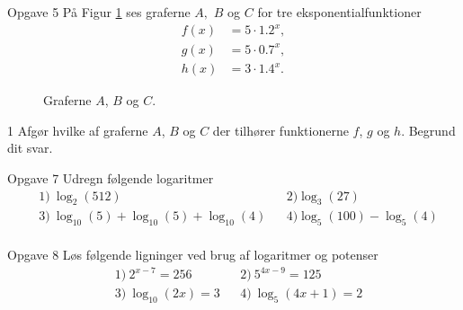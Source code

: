 \begin{opgavetekst}{Opgave 5}
	På Figur \ref{fig:grafer} ses graferne $A,$ $B$ og $C$ for tre eksponentialfunktioner
	\begin{align*}
		f(x) &= 5\cdot 1.2^x,\\
		g(x) &= 5 \cdot 0.7^x,  \\
		h(x) &= 3 \cdot 1.4^x.
	\end{align*}
	\begin{figure}[H]
		\centering
		\caption{Graferne $A$, $B$ og $C$.}
		\label{fig:grafer}
	\end{figure}
	\phantom{h}
\end{opgavetekst}
\begin{delopgave}{}{1}
	Afgør hvilke af graferne $A$, $B$ og $C$ der tilhører funktionerne $f$, $g$ og $h$. Begrund dit svar.
\end{delopgave}

\begin{opgavetekst}{Opgave 7}
	Udregn følgende logaritmer
	\begin{align*}
		&1) \  \log_2(512)  &   &2) \log_3(27) \\
		&3) \  \log_{10}(5) + \log_{10}(5) + \log_{10}(4)  &   &4) \log_5(100) - \log_5(4) \\
	\end{align*}
\end{opgavetekst}

\begin{opgavetekst}{Opgave 8}
	Løs følgende ligninger ved brug af logaritmer og potenser
	\begin{align*}
		&1) \ 2^{x-7} = 256 &   &2) \ 5^{4x-9} = 125\\
		&3) \ \log_{10}(2x) = 3 &   &4) \ \log_{5}(4x+1) = 2\\
	\end{align*}
\end{opgavetekst}

